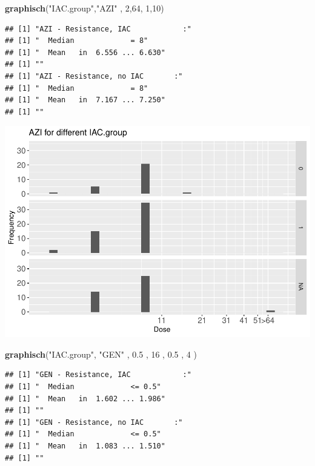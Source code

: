 \documentclass[
]{article}
\newenvironment{Shaded}{\begin{snugshade}}{\end{snugshade}}
\newcommand{\DecValTok}[1]{\textcolor[rgb]{0.00,0.00,0.81}{#1}}
\newcommand{\FloatTok}[1]{\textcolor[rgb]{0.00,0.00,0.81}{#1}}
\newcommand{\KeywordTok}[1]{\textcolor[rgb]{0.13,0.29,0.53}{\textbf{#1}}}
\newcommand{\NormalTok}[1]{#1}
\newcommand{\StringTok}[1]{\textcolor[rgb]{0.31,0.60,0.02}{#1}}
\begin{document}
\begin{Shaded}
\begin{Highlighting}[]
   \KeywordTok{graphisch}\NormalTok{(}\StringTok{"IAC.group"}\NormalTok{,}\StringTok{"AZI"}\NormalTok{ , }\DecValTok{2}\NormalTok{,}\DecValTok{64}\NormalTok{,   }\DecValTok{1}\NormalTok{,}\DecValTok{10}\NormalTok{)}
\end{Highlighting}
\end{Shaded}

\begin{verbatim}
## [1] "AZI - Resistance, IAC            :"
## [1] "  Median             = 8"
## [1] "  Mean   in  6.556 ... 6.630"
## [1] ""
## [1] "AZI - Resistance, no IAC       :"
## [1] "  Median             = 8"
## [1] "  Mean   in  7.167 ... 7.250"
## [1] ""
\end{verbatim}

\includegraphics{Verteilungen_files/figure-latex/unnamed-chunk-8-1.pdf}

\begin{Shaded}
\begin{Highlighting}[]
   \KeywordTok{graphisch}\NormalTok{(}\StringTok{"IAC.group"}\NormalTok{, }\StringTok{"GEN"}\NormalTok{ , }\FloatTok{0.5}\NormalTok{  ,  }\DecValTok{16}\NormalTok{   ,   }\FloatTok{0.5}\NormalTok{  ,   }\DecValTok{4}\NormalTok{    )}
\end{Highlighting}
\end{Shaded}

\begin{verbatim}
## [1] "GEN - Resistance, IAC            :"
## [1] "  Median             <= 0.5"
## [1] "  Mean   in  1.602 ... 1.986"
## [1] ""
## [1] "GEN - Resistance, no IAC       :"
## [1] "  Median             <= 0.5"
## [1] "  Mean   in  1.083 ... 1.510"
## [1] ""
\end{verbatim}
\end{document}
